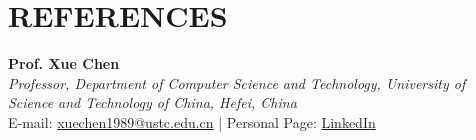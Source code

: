 \documentclass[a4paper,9pt]{extarticle}
\begin{document}

\section*{REFERENCES}

\textbf{Prof. Xue Chen}\\
\textit{Professor, Department of Computer Science and Technology, University of Science and Technology of China, Hefei, China}\\
E-mail: \href{mailto:xuechen1989@ustc.edu.cn}{xuechen1989@ustc.edu.cn} | Personal Page: \href{http://staff.ustc.edu.cn/~xuechen1989/}{LinkedIn} \\ \\
\end{document}
